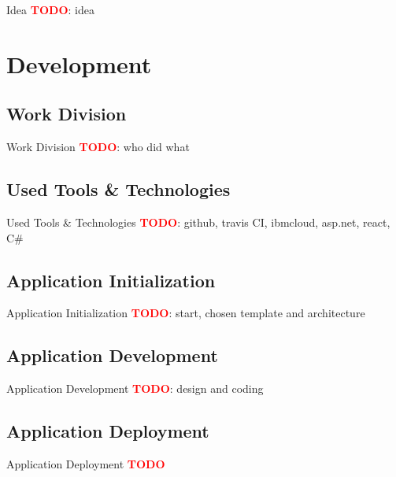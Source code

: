 \documentclass[]{beamer}
\newcommand{\TODO}{\textbf{\textcolor{red}{TODO}}} %
\begin{document}
    \begin{frame}{Idea}
      \TODO: idea
    \end{frame}

\section[Development]{Development}

  \subsection{Work Division}

    \begin{frame}{Work Division}
      \TODO: who did what
    \end{frame}

  \subsection{Used Tools \& Technologies}

    \begin{frame}{Used Tools \& Technologies}
      \TODO: github, travis CI, ibmcloud, asp.net, react, C\#
    \end{frame}

  \subsection{Application Initialization}

    \begin{frame}{Application Initialization}
      \TODO: start, chosen template and architecture
    \end{frame}

  \subsection{Application Development}

    \begin{frame}{Application Development}
      \TODO: design and coding
    \end{frame}

  \subsection{Application Deployment}

    \begin{frame}{Application Deployment}
      \TODO
    \end{frame}
\end{document}
